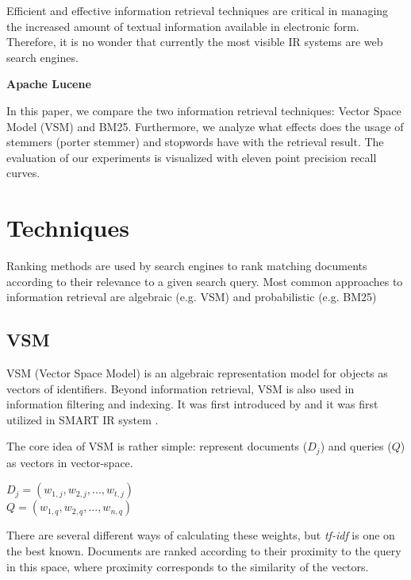 Efficient and effective information retrieval techniques are critical in managing the increased amount of textual information available in electronic form. Therefore, it is no wonder that currently the most visible IR systems are web search engines.  

\textbf{Apache Lucene}

In this paper, we compare the two information retrieval techniques: Vector Space Model (VSM) and BM25. Furthermore, we analyze what effects does the usage of stemmers (porter stemmer) and stopwords have with the retrieval result. The evaluation of our experiments is visualized with eleven point precision recall curves. 


\section{Techniques}

Ranking methods are used by search engines to rank matching documents according to their relevance to a given search query. Most common approaches to information retrieval are algebraic (e.g. VSM) and probabilistic (e.g. BM25)

\subsection{VSM}

VSM (Vector Space Model) is an algebraic representation model for objects as vectors of identifiers. Beyond information retrieval, VSM is also used in information filtering and indexing. It was first introduced by \citep{ref1} and it was first utilized in SMART IR system \citep{ref2}.

The core idea of VSM is rather simple: represent documents ($D_j$) and queries ($Q$) as vectors in vector-space. 

\begin{center}
$ D_j = (w_{1,j}, w_{2,j},...,w_{t,j}) $ \\
$ Q = (w_{1,q}, w_{2,q},...,w_{n,q}) $
\end{center}

There are several different ways of calculating these weights, but \textit{tf-idf} is one on the best known. Documents are ranked according to their proximity to the query in this space, where proximity corresponds to the similarity of the vectors. 



